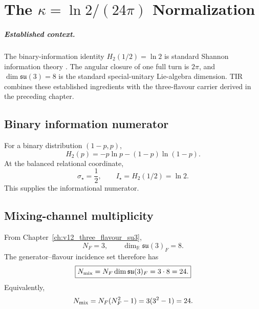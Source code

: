 \chapter[The Kappa Normalization]{The \texorpdfstring{$\kappa=\ln2/(24\pi)$}{kappa = ln2/(24 pi)} Normalization}
\label{ch:v12_kappa_normalization}

\paragraph{Established context.}
The binary-information identity $H_2(1/2)=\ln2$ is standard Shannon
information theory \cite{shannon1948,CoverThomas2006}.  The angular closure of
one full turn is $2\pi$, and $\dim\mathfrak{su}(3)=8$ is the standard
special-unitary Lie-algebra dimension.  TIR combines these established
ingredients with the three-flavour carrier derived in the preceding chapter.


\section{Binary information numerator}
For a binary distribution $(1-p,p)$,
\[
H_2(p)=-p\ln p-(1-p)\ln(1-p).
\]
At the balanced relational coordinate,
\begin{equation}
\boxed{
\sigma_\star=\frac12,
\qquad
I_\star=H_2(1/2)=\ln2.
}
\label{eq:v12-kappa-binary-information}
\end{equation}
This supplies the informational numerator.

\section{Mixing-channel multiplicity}
From Chapter~\ref{ch:v12_three_flavour_su3},
\[
N_F=3,
\qquad
\dim_{\mathbb R}\mathfrak{su}(3)_F=8.
\]
The generator--flavour incidence set therefore has
\begin{equation}
\boxed{
N_{\rm mix}
=N_F\dim\mathfrak{su}(3)_F
=3\cdot8
=24.
}
\label{eq:v12-kappa-mixing-count}
\end{equation}
Equivalently,
\[
N_{\rm mix}
=N_F(N_F^2-1)
=3(3^2-1)
=24.
\]

